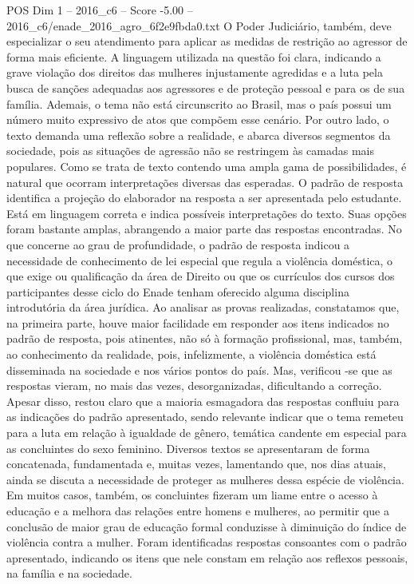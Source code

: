 \begin{textsample}{POS Dim 1 – 2016\_c6 – Score -5.00 – 2016\_c6/enade\_2016\_agro\_6f2e9fbda0.txt}
O Poder Judiciário, também, deve especializar o seu atendimento para aplicar as medidas de restrição ao agressor de forma mais eficiente.
A linguagem utilizada na questão foi clara, indicando a grave violação dos direitos das mulheres injustamente agredidas e a luta pela busca de sanções adequadas aos agressores e de proteção pessoal e para os de sua família.
Ademais, o tema não está circunscrito ao Brasil, mas o país possui um número muito expressivo de atos que compõem esse cenário.
Por outro lado, o texto demanda uma reflexão sobre a realidade, e abarca diversos segmentos da sociedade, pois as situações de agressão não se restringem às camadas mais populares.
Como se trata de texto contendo uma ampla gama de possibilidades, é natural que ocorram interpretações diversas das esperadas.
O padrão de resposta identifica a projeção do elaborador na resposta a ser apresentada pelo estudante.
Está em linguagem correta e indica possíveis interpretações do texto.
Suas opções foram bastante amplas, abrangendo a maior parte das respostas encontradas.
No que concerne ao grau de profundidade, o padrão de resposta indicou a necessidade de conhecimento de lei especial que regula a violência doméstica, o que exige ou qualificação da área de Direito ou que os currículos dos cursos dos participantes desse ciclo do Enade tenham oferecido alguma disciplina introdutória da área jurídica.
Ao analisar as provas realizadas, constatamos que, na primeira parte, houve maior facilidade em responder aos itens indicados no padrão de resposta, pois atinentes, não só à formação profissional, mas, também, ao conhecimento da realidade, pois, infelizmente, a violência doméstica está disseminada na sociedade e nos vários pontos do país.
Mas, verificou -se que as respostas vieram, no mais das vezes, desorganizadas, dificultando a correção.
Apesar disso, restou claro que a maioria esmagadora das respostas confluiu para as indicações do padrão apresentado, sendo relevante indicar que o tema remeteu para a luta em relação à igualdade de gênero, temática candente em especial para as concluintes do sexo feminino.
Diversos textos se apresentaram de forma concatenada, fundamentada e, muitas vezes, lamentando que, nos dias atuais, ainda se discuta a necessidade de proteger as mulheres dessa espécie de violência.
Em muitos casos, também, os concluintes fizeram um liame entre o acesso à educação e a melhora das relações entre homens e mulheres, ao permitir que a conclusão de maior grau de educação formal conduzisse à diminuição do índice de violência contra a mulher.
Foram identificadas respostas consoantes com o padrão apresentado, indicando os itens que nele constam em relação aos reflexos pessoais, na família e na sociedade.

\end{textsample}
